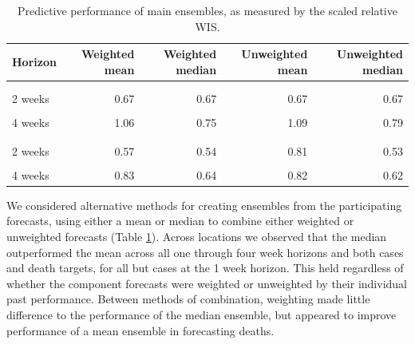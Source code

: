 \documentclass[
]{article}
\begin{document}
\begin{table}

\caption{\label{tab:ensembles}Predictive performance of main ensembles, as measured by the scaled relative WIS.}
\centering
\begin{tabular}[t]{lrrrr}
\toprule
Horizon & Weighted mean & Weighted median & Unweighted mean & Unweighted median\\
\midrule
\addlinespace[0.3em]
\multicolumn{5}{l}{\textbf{Cases}}\\
\hspace{1em}\cellcolor{gray!6}{1 week} & \cellcolor{gray!6}{0.59} & \cellcolor{gray!6}{0.62} & \cellcolor{gray!6}{0.59} & \cellcolor{gray!6}{0.61}\\
\hspace{1em}2 weeks & 0.67 & 0.67 & 0.67 & 0.67\\
\hspace{1em}\cellcolor{gray!6}{3 weeks} & \cellcolor{gray!6}{0.79} & \cellcolor{gray!6}{0.70} & \cellcolor{gray!6}{0.81} & \cellcolor{gray!6}{0.71}\\
\hspace{1em}4 weeks & 1.06 & 0.75 & 1.09 & 0.79\\
\addlinespace[0.3em]
\multicolumn{5}{l}{\textbf{Deaths}}\\
\hspace{1em}\cellcolor{gray!6}{1 week} & \cellcolor{gray!6}{0.63} & \cellcolor{gray!6}{0.59} & \cellcolor{gray!6}{1.00} & \cellcolor{gray!6}{0.59}\\
\hspace{1em}2 weeks & 0.57 & 0.54 & 0.81 & 0.53\\
\hspace{1em}\cellcolor{gray!6}{3 weeks} & \cellcolor{gray!6}{0.64} & \cellcolor{gray!6}{0.56} & \cellcolor{gray!6}{0.83} & \cellcolor{gray!6}{0.54}\\
\hspace{1em}4 weeks & 0.83 & 0.64 & 0.82 & 0.62\\
\bottomrule
\end{tabular}
\end{table}

We considered alternative methods for creating ensembles from the participating forecasts, using either a mean or median to combine either weighted or unweighted forecasts (Table \ref{tab:ensembles}). Across locations we observed that the median outperformed the mean across all one through four week horizons and both cases and death targets, for all but cases at the 1 week horizon. This held regardless of whether the component forecasts were weighted or unweighted by their individual past performance. Between methods of combination, weighting made little difference to the performance of the median ensemble, but appeared to improve performance of a mean ensemble in forecasting deaths.
\end{document}
